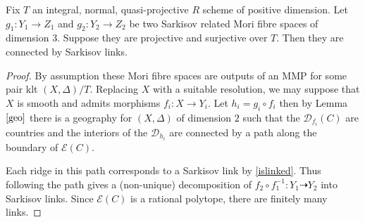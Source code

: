 \documentclass[a4paper,12pt]{amsart}
\begin{document}
	\begin{theorem}\label{sarkisov}
		Fix $T$ an integral, normal, quasi-projective $R$ scheme of positive dimension. Let $g_{1}:Y_{1} \to Z_{1}$ and $g_{2}:Y_{2} \to Z_{2}$ be two Sarkisov related Mori fibre spaces of dimension $3$. Suppose they are projective and surjective over $T$. Then they are connected by Sarkisov links.
	\end{theorem}

	\begin{proof}
		
		By assumption these Mori fibre spaces are outputs of an MMP for some pair klt $(X,\Delta)/T$. Replacing $X$ with a suitable resolution, we may suppose that $X$ is smooth and admits morphisms $f_{i}:X \to Y_{i}$. Let $h_{i}=g_{i} \circ f_{i}$ then by Lemma $\ref{geo}$ there is a geography for $(X,\Delta)$ of dimension $2$ such that the $\mathcal{D}_{f_{i}}(C)$ are countries and the interiors of the $\mathcal{D}_{h_{i}}$ are connected by a path along the boundary of $\mathcal{E}(C)$. 
		
		Each ridge in this path corresponds to a Sarkisov link by \autoref{islinked}. Thus following the path gives a (non-unique) decomposition of $f_{2} \circ f_{1}^{-1} \colon Y_{1} \dashrightarrow Y_{2}$ into Sarkisov links. Since $\mathcal{E}(C)$ is a rational polytope, there are finitely many links.
		
		
	\end{proof}
	
	
	
\end{document}
